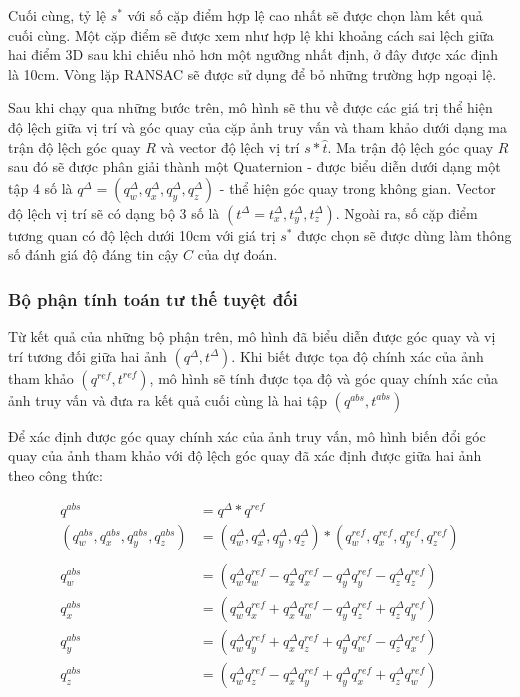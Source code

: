 Cuối cùng, tỷ lệ $s^*$ với số cặp điểm hợp lệ cao nhất sẽ được chọn làm kết quả cuối cùng. Một cặp điểm sẽ được xem như hợp lệ khi khoảng cách sai lệch giữa hai điểm 3D sau khi chiếu nhỏ hơn một ngưỡng nhất định, ở đây được xác định là 10cm. Vòng lặp RANSAC sẽ được sử dụng để bỏ những trường hợp ngoại lệ.

Sau khi chạy qua những bước trên, mô hình sẽ thu về được các giá trị thể hiện độ lệch giữa vị trí và góc quay của cặp ảnh truy vấn và tham khảo dưới dạng ma trận độ lệch góc quay $R$ và vector độ lệch vị trí $s*\hat{t}$. Ma trận độ lệch góc quay $R$ sau đó sẽ được phân giải thành một Quaternion - được biểu diễn dưới dạng một tập 4 số là $q^{\Delta} = (q^{\Delta}_w,q^{\Delta}_x,q^{\Delta}_y,q^{\Delta}_z)$ - thể hiện góc quay trong không gian. Vector độ lệch vị trí sẽ có dạng bộ 3 số là $(t^{\Delta} = t^{\Delta}_x,t^{\Delta}_y,t^{\Delta}_z)$. Ngoài ra, số cặp điểm tương quan có độ lệch dưới 10cm với giá trị $s^*$ được chọn sẽ được dùng làm thông số đánh giá độ đáng tin cậy $C$ của dự đoán.


\subsubsection{Bộ phận tính toán tư thế tuyệt đối}

Từ kết quả của những bộ phận trên, mô hình đã biểu diễn được góc quay và vị trí tương đối giữa hai ảnh $(q^{\Delta},t^{\Delta})$. Khi biết được tọa độ chính xác của ảnh tham khảo $(q^{ref},t^{ref})$, mô hình sẽ tính được tọa độ và góc quay chính xác của ảnh truy vấn và đưa ra kết quả cuối cùng là hai tập $(q^{abs},t^{abs})$

Để xác định được góc quay chính xác của ảnh truy vấn, mô hình biến đổi góc quay của ảnh tham khảo với độ lệch góc quay đã xác định được giữa hai ảnh theo công thức:

\begin{equation}
  \begin{aligned}
    q^{abs}                                   & = q^{\Delta} * q^{ref}                                                                                    \\
    (q^{abs}_w,q^{abs}_x,q^{abs}_y,q^{abs}_z) & = (q^{\Delta}_w,q^{\Delta}_x,q^{\Delta}_y,q^{\Delta}_z) * (q^{ref}_w,q^{ref}_x,q^{ref}_y,q^{ref}_z)       \\ \\
    q^{abs}_w                                 & =\left(q^{\Delta}_w q^{ref}_w-q^{\Delta}_x q^{ref}_x-q^{\Delta}_y q^{ref}_y-q^{\Delta}_z q^{ref}_z\right) \\
    q^{abs}_x                                 & =\left(q^{\Delta}_w q^{ref}_x+q^{\Delta}_x q^{ref}_w-q^{\Delta}_y q^{ref}_z+q^{\Delta}_z q^{ref}_y\right) \\
    q^{abs}_y                                 & =\left(q^{\Delta}_w q^{ref}_y+q^{\Delta}_x q^{ref}_z+q^{\Delta}_y q^{ref}_w-q^{\Delta}_z q^{ref}_x\right) \\
    q^{abs}_z                                 & =\left(q^{\Delta}_w q^{ref}_z-q^{\Delta}_x q^{ref}_y+q^{\Delta}_y q^{ref}_x+q^{\Delta}_z q^{ref}_w\right)
  \end{aligned}
\end{equation}


